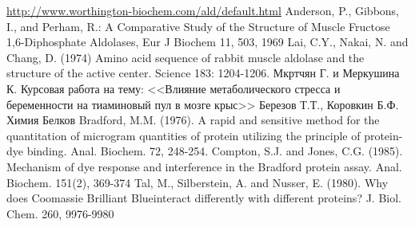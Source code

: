 \begin{thebibliography}{WW}
 \url{http://www.worthington-biochem.com/ald/default.html}
 Anderson, P., Gibbons, I., and Perham, R.:
    A Comparative Study of the Structure of Muscle Fructose 1,6-Diphosphate Aldolases,
    Eur J Biochem 11, 503, 1969
  Lai, C.Y., Nakai, N. and Chang, D. (1974)
    Amino acid sequence of rabbit muscle aldolase and the structure of the active center.
    Science 183: 1204-1206.
 Мкртчян Г. и Меркушина К.
    Курсовая работа  на тему:
    <<Влияние метаболического стресса и беременности на тиаминовый пул в мозге крыс>>
 Березов Т.Т., Коровкин Б.Ф.
    Химия Белков
 Bradford, M.M. (1976).
    A rapid and sensitive method for the quantitation of microgram quantities of
    protein utilizing the principle of protein-dye binding. Anal. Biochem. 72, 248-254.
 Compton, S.J. and Jones, C.G. (1985).
    Mechanism of dye response and interference in the Bradford protein assay.
    Anal. Biochem. 151(2), 369-374
 Tal, M., Silberstein, A. and Nusser, E. (1980).
    Why does Coomassie Brilliant Blue\textregistered interact differently with different proteins?
    J. Biol. Chem. 260, 9976-9980
\end{thebibliography}

